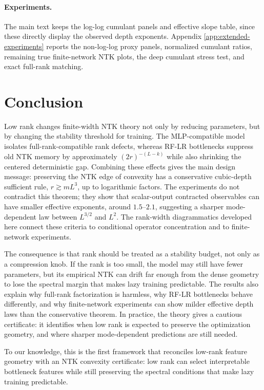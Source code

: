 \documentclass{article}
\begin{document}
\paragraph{Experiments.}
The main text keeps the log-log cumulant panels and effective slope table, since these directly display the observed depth exponents. Appendix \ref{app:extended-experiments} reports the non-log-log proxy panels, normalized cumulant ratios, remaining true finite-network NTK plots, the deep cumulant stress test, and exact full-rank matching.

\FloatBarrier

\section{Conclusion}
Low rank changes finite-width NTK theory not only by reducing parameters, but by changing the stability threshold for training. The MLP-compatible model isolates full-rank-compatible rank defects, whereas RF-LR bottlenecks suppress old NTK memory by approximately \((2r)^{-(L-k)}\) while also shrinking the centered deterministic gap. Combining these effects gives the main design message: preserving the NTK edge of convexity has a conservative cubic-depth sufficient rule, \(r\gtrsim mL^3\), up to logarithmic factors. The experiments do not contradict this theorem; they show that scalar-output contracted observables can have smaller effective exponents, around \(1.5\)--\(2.1\), suggesting a sharper mode-dependent law between \(L^{3/2}\) and \(L^2\). The rank-width diagrammatics developed here connect these criteria to conditional operator concentration and to finite-network experiments.

The consequence is that rank should be treated as a stability budget, not only as a compression knob. If the rank is too small, the model may still have fewer parameters, but its empirical NTK can drift far enough from the dense geometry to lose the spectral margin that makes lazy training predictable. The results also explain why full-rank factorization is harmless, why RF-LR bottlenecks behave differently, and why finite-network experiments can show milder effective depth laws than the conservative theorem. In practice, the theory gives a cautious certificate: it identifies when low rank is expected to preserve the optimization geometry, and where sharper mode-dependent predictions are still needed.

To our knowledge, this is the first framework that reconciles low-rank feature geometry with an NTK convexity certificate: low rank can select interpretable bottleneck features while still preserving the spectral conditions that make lazy training predictable.
\end{document}
